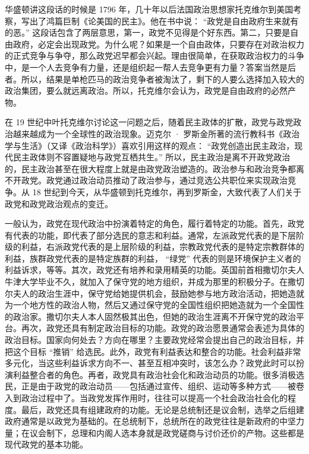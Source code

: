 华盛顿讲这段话的时候是 1796 年，几十年以后法国政治思想家托克维尔到美国考察，写出了鸿篇巨制《论美国的民主》。他在书中说： “政党是自由政府生来就有的恶。” 这段话包含了两层意思，第一，政党不见得是个好东西。第二，只要是自由政府，必定会出现政党。为什么呢？如果是一个自由政体，只要存在对政治权力的正式竞争与争夺，那么政党迟早都会兴起。理由很简单，在获取政治权力的斗争中，是一个人去竞争有力量，还是组织起一帮人去竞争更有力量？答案当然是后者。所以，结果是单枪匹马的政治竞争者被淘汰了，剩下的人要么选择加入较大的政治集团，要么就远离政治。所以，托克维尔会认为，政党是自由政府的必然产物。

在 19 世纪中叶托克维尔讨论这一问题之后，随着民主政体的扩散，政党与政党政治越来越成为一个全球性的政治现象。迈克尔 · 罗斯金所著的流行教科书《政治学与生活》（又译《政治科学》）喜欢引用这样的观点： “政党创造出民主政治，现代民主政体则不容置疑地与政党互栖共生。” 所以，民主政治是离不开政党政治的，民主政治甚至在很大程度上就是由政党政治塑造的。政治参与和政治竞争都离不开政党。政党通过政治动员推动了政治参与，通过竞选公共职位来实现政治竞争。从 18 世纪到今天，从华盛顿到托克维尔，再到罗斯金，大致代表了人们关于政党和政党政治观点的变迁。

一般认为，政党在现代政治中扮演着特定的角色，履行着特定的功能。首先，政党有代表的功能，即代表了部分选民的意志和利益。通常，左派政党代表的是下层阶级的利益，右派政党代表的是上层阶级的利益，宗教政党代表的是特定宗教群体的利益，族群政党代表的是特定族群的利益， “绿党” 代表的则是环境保护主义者的利益诉求，等等。其次，政党还有培养和录用精英的功能。英国前首相撒切尔夫人牛津大学毕业不久，就加入了保守党的地方组织，并成为那里的积极分子。在撒切尔夫人的政治生涯中，保守党给她提供机会，鼓励她参与地方政治活动，把她造就为一个地方性的政治人物，然后又通过保守党的全国性组织把她造就为一个全国性的政治家。撒切尔夫人本人固然极其出色，但她的政治生涯离不开保守党的政治平台。再次，政党还具有制定政治目标的功能。政党的政治愿景通常会表述为具体的政治目标。国家向何处去？方向在哪里？主要政党经常会提出自己的政治目标，并把这个目标 “推销” 给选民。此外，政党有利益表达和整合的功能。社会利益非常多元化，当这些利益诉求方向不一、甚至互相冲突时，该怎么办？政党此时可以扮演利益整合者的角色。再者，政党具有政治社会化和政治动员的功能。很多消极选民，正是由于政党的政治动员——包括通过宣传、组织、运动等多种方式——被卷入到政治过程中了。当政党发挥作用时，往往可以提高一个社会政治社会化的程度。最后，政党还具有组建政府的功能。无论是总统制还是议会制，选举之后组建政府通常是以政党为基础的。在总统制下，总统所在的政党往往是新政府的中坚力量；在议会制下，总理和内阁人选本身就是政党磋商与讨价还价的产物。这些都是现代政党的基本功能。

